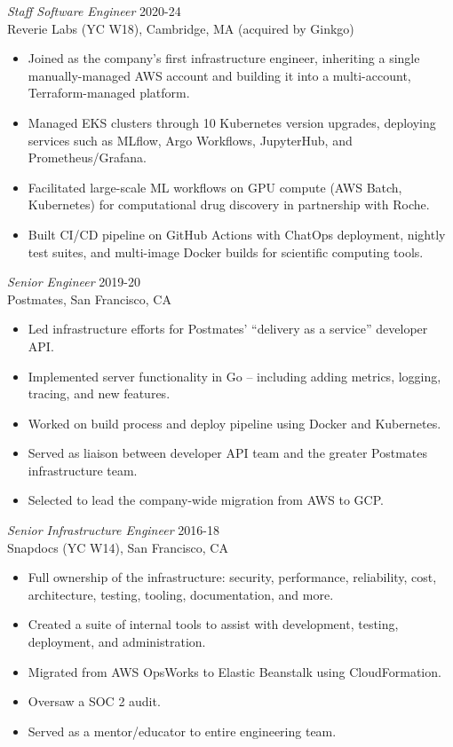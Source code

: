 \documentclass[line,margin]{res}
\begin{document}
\begin{resume}
  \textsl{Staff Software Engineer}  \hfill 2020-24 \\
  Reverie Labs {\scriptsize\textsf{(YC W18)}},
  Cambridge, MA (acquired by Ginkgo)
  \begin{itemize}  \itemsep -2pt %
    \item Joined as the company's first infrastructure engineer, inheriting a single manually-managed AWS account and building it into a multi-account, Terraform-managed platform.
    \item Managed EKS clusters through 10 Kubernetes version upgrades, deploying services such as MLflow, Argo Workflows, JupyterHub, and Prometheus/Grafana.
    \item Facilitated large-scale ML workflows on GPU compute (AWS Batch, Kubernetes) for computational drug discovery in partnership with Roche.
    \item Built CI/CD pipeline on GitHub Actions with ChatOps deployment, nightly test suites, and multi-image Docker builds for scientific computing tools.
  \end{itemize}

  \textsl{Senior Engineer}  \hfill 2019-20 \\
  Postmates,
  San Francisco, CA
  \begin{itemize}  \itemsep -2pt %
    \item Led infrastructure efforts for Postmates' ``delivery as a service'' developer API.
    \item Implemented server functionality in Go -- including adding metrics, logging, tracing, and new features.
    \item Worked on build process and deploy pipeline using Docker and Kubernetes.
    \item Served as liaison between developer API team and the greater Postmates infrastructure team.
    \item Selected to lead the company-wide migration from AWS to GCP.
  \end{itemize}

  \textsl{Senior Infrastructure Engineer}  \hfill 2016-18 \\
  Snapdocs {\scriptsize\textsf{(YC W14)}},
  San Francisco, CA
  \begin{itemize}  \itemsep -2pt %
    \item Full ownership of the infrastructure: security, performance, reliability, cost, architecture, testing, tooling, documentation, and more.
    \item Created a suite of internal tools to assist with development, testing, deployment, and administration.
    \item Migrated from AWS OpsWorks to Elastic Beanstalk using CloudFormation.
    \item Oversaw a SOC 2 audit.
    \item Served as a mentor/educator to entire engineering team.
  \end{itemize}


\end{resume}
\end{document}
